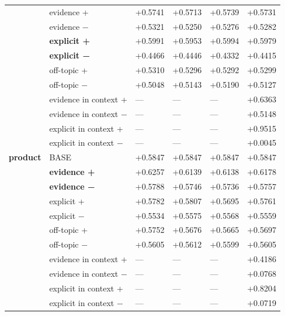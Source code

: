 \begin{table}[htbp]
{\begin{tabular}{ llllll }
 & evidence + & +0.5741 & +0.5713 & +0.5739 & +0.5731 \\
 & evidence − & +0.5321 & +0.5250 & +0.5276 & +0.5282 \\
 & \textbf{explicit +} & +0.5991 & +0.5953 & +0.5994 & +0.5979 \\
 & \textbf{explicit −} & +0.4466 & +0.4446 & +0.4332 & +0.4415 \\
 & off-topic + & +0.5310 & +0.5296 & +0.5292 & +0.5299 \\
 & off-topic − & +0.5048 & +0.5143 & +0.5190 & +0.5127 \\
 & evidence in context + & — & — & — & +0.6363 \\
 & evidence in context − & — & — & — & +0.5148 \\
 & explicit in context + & — & — & — & +0.9515 \\
 & explicit in context − & — & — & — & +0.0045 \\
\textbf{product} & BASE & +0.5847 & +0.5847 & +0.5847 & +0.5847 \\
 & \textbf{evidence +} & +0.6257 & +0.6139 & +0.6138 & +0.6178 \\
 & \textbf{evidence −} & +0.5788 & +0.5746 & +0.5736 & +0.5757 \\
 & explicit + & +0.5782 & +0.5807 & +0.5695 & +0.5761 \\
 & explicit − & +0.5534 & +0.5575 & +0.5568 & +0.5559 \\
 & off-topic + & +0.5752 & +0.5676 & +0.5665 & +0.5697 \\
 & off-topic − & +0.5605 & +0.5612 & +0.5599 & +0.5605 \\
 & evidence in context + & — & — & — & +0.4186 \\
 & evidence in context − & — & — & — & +0.0768 \\
 & explicit in context + & — & — & — & +0.8204 \\
 & explicit in context − & — & — & — & +0.0719 \\
\bottomrule
\end{tabular}
}
\end{table}
